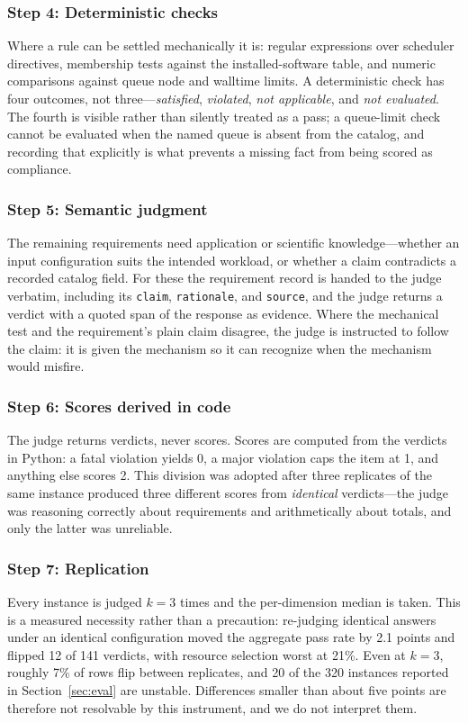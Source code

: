 \documentclass[conference]{IEEEtran}
\begin{document}
\subsubsection{Step 4: Deterministic checks}
Where a rule can be settled mechanically it is: regular expressions over scheduler directives, membership tests against the installed-software table, and numeric comparisons against queue node and walltime limits. A deterministic check has four outcomes, not three---\emph{satisfied}, \emph{violated}, \emph{not applicable}, and \emph{not evaluated}. The fourth is visible rather than silently treated as a pass; a queue-limit check cannot be evaluated when the named queue is absent from the catalog, and recording that explicitly is what prevents a missing fact from being scored as compliance.

\subsubsection{Step 5: Semantic judgment}
The remaining requirements need application or scientific knowledge---whether an input configuration suits the intended workload, or whether a claim contradicts a recorded catalog field. For these the requirement record is handed to the judge verbatim, including its \texttt{claim}, \texttt{rationale}, and \texttt{source}, and the judge returns a verdict with a quoted span of the response as evidence. Where the mechanical test and the requirement's plain claim disagree, the judge is instructed to follow the claim: it is given the mechanism so it can recognize when the mechanism would misfire.

\subsubsection{Step 6: Scores derived in code}
The judge returns verdicts, never scores. Scores are computed from the verdicts in Python: a fatal violation yields 0, a major violation caps the item at 1, and anything else scores 2. This division was adopted after three replicates of the same instance produced three different scores from \emph{identical} verdicts---the judge was reasoning correctly about requirements and arithmetically about totals, and only the latter was unreliable.

\subsubsection{Step 7: Replication}
Every instance is judged $k=3$ times and the per-dimension median is taken. This is a measured necessity rather than a precaution: re-judging identical answers under an identical configuration moved the aggregate pass rate by 2.1 points and flipped 12 of 141 verdicts, with resource selection worst at 21\%. Even at $k=3$, roughly 7\% of rows flip between replicates, and 20 of the 320 instances reported in Section~\ref{sec:eval} are unstable. Differences smaller than about five points are therefore not resolvable by this instrument, and we do not interpret them.
\end{document}
